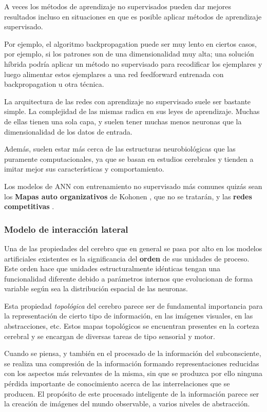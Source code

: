 A veces los métodos de aprendizaje no supervisados pueden dar mejores resultados incluso en situaciones en que es posible aplicar métodos de aprendizaje supervisado. 

Por ejemplo, el algoritmo backpropagation puede ser muy lento en ciertos casos, por ejemplo, si los patrones son de una dimensionalidad muy alta; una solución híbrida podría aplicar un método no supervisado para recodificar los ejemplares y luego alimentar estos ejemplares a una red feedforward entrenada con backpropagation u otra técnica.

La arquitectura de las redes con aprendizaje no supervisado suele ser bastante simple. La complejidad de las mismas radica en sus leyes de aprendizaje. Muchas de ellas tienen una sola capa, y suelen tener muchas menos neuronas que la dimensionalidad de los datos de entrada.

Además, suelen estar más cerca de las estructuras neurobiológicas que las puramente computacionales, ya que se basan en estudios cerebrales y tienden a imitar mejor sus características y comportamiento.

Los modelos de ANN con entrenamiento no supervisado más comunes quizás sean los \textbf{Mapas auto organizativos} de Kohonen \cite{kohonen2001}, que no se tratarán, y las \textbf{redes competitivas} \cite{grossberg1987}. 

\subsubsection{Modelo de interacción lateral}

Una de las propiedades del cerebro que en general se pasa por alto en los modelos artificiales existentes es la significancia del \textbf{orden} de sus unidades de proceso. Este orden hace que unidades estructuralmente idénticas tengan una funcionalidad diferente debido a parámetros internos que evolucionan de forma variable según sea la distribución espacial de las neuronas.

Esta propiedad \textit{topológica}  del cerebro parece ser de fundamental importancia para la representación de cierto tipo de información, en las imágenes visuales, en las abstracciones, etc. Estos mapas topológicos se encuentran presentes en la corteza cerebral y se encargan de diversas tareas de tipo sensorial y motor. 

Cuando se piensa, y también en el procesado de la información del subconsciente, se realiza una compresión de la información formando representaciones reducidas con los aspectos más relevantes de la misma, sin que se produzca por ello ninguna pérdida importante de conocimiento acerca de las interrelaciones que se producen. El propósito de este procesado inteligente de la información parece ser la creación de imágenes del mundo observable, a varios niveles de abstracción.

